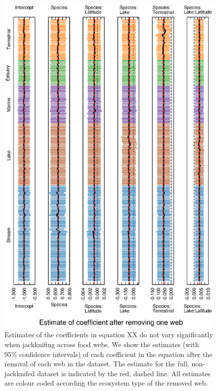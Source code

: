 \documentclass[12pt]{article}
\begin{document}
    \begin{figure}[h]
    \centerline{\includegraphics*[width=.8\textwidth]{Figures/Jackknife/Vul_web.eps}}
    \caption{Estimates of the coefficients in equation XX do not vary significantly
    when jackknifing across food webs. We show the estimates (with 95\% confidence intervals) of each coefficient
    in the equation after the removal of each web in the dataset.  The estimate for the full, non-jackknifed 
    dataset is indicated by the red, dashed line. All estimates are colour
    coded according the ecosystem type of the removed web.}
    \label{Vul_web}
    \end{figure}
\end{document}
